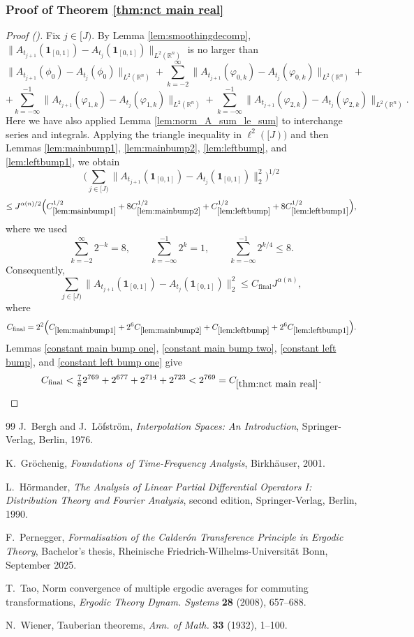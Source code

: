 \documentclass[12pt,reqno]{amsart}
\newcommand{\auto}{{({\tiny\faCar})}}
\theoremstyle{plain}
\numberwithin{equation}{section}
\theoremstyle{remark}
\newcommand{\R}{{\mathbb R}}
\begin{document}
\subsubsection{\texorpdfstring{Proof of Theorem \ref{thm:nct main real}}{Proof of main theorem}}
\begin{proof}[Proof \auto]
Fix $j\in [J)$.
By Lemma \ref{lem:smoothingdecomp},
$\|A_{t_{j + 1}}(\mathbf{1}_{[0,1]}) - A_{t_{j}}(\mathbf{1}_{[0,1]})\|_{{L}^2(\R^n)}$
is no larger than
\[ \|A_{t_{j+1}}(\phi_0) - A_{t_j}(\phi_0)\|_{L^2(\R^n)}  + \sum_{k=-2}^\infty\|A_{t_{j+1}}(\varphi_{0,k}) - A_{t_{j}}(\varphi_{0,k})\|_{L^2(\R^n)}  + \]
\[ +\sum_{k=-\infty}^{-1}\|A_{t_{j+1}}(\varphi_{1,k}) - A_{t_{j}}(\varphi_{1,k})\|_{L^2(\R^n)}  + \sum_{k=-\infty}^{-1}\|A_{t_{j+1}}({\varphi_{2,k}}) - A_{t_{j}}({\varphi_{2,k}})\|_{L^2(\R^n)}. \]
Here we have also applied Lemma \ref{lem:norm_A_sum_le_sum} to interchange series and integrals.
Applying the triangle inequality in $\ell^2([J))$ and then Lemmas \ref{lem:mainbump1}, \ref{lem:mainbump2}, \ref{lem:leftbump}, and \ref{lem:leftbump1}, we obtain
\[
\Big(\sum_{j\in[J)}\|A_{t_{j+1}}(\mathbf1_{[0,1]})-A_{t_j}(\mathbf1_{[0,1]})\|_2^2\Big)^{1/2}
\]
\[
\le J^{\alpha(n)/2}\Big(
C_{\ref{lem:mainbump1}}^{1/2}
+8C_{\ref{lem:mainbump2}}^{1/2}
+C_{\ref{lem:leftbump}}^{1/2}
+8C_{\ref{lem:leftbump1}}^{1/2}
\Big),
\]
where we used
\[
\sum_{k=-2}^\infty2^{-k}=8,
\qquad
\sum_{k=-\infty}^{-1}2^k=1,
\qquad
\sum_{k=-\infty}^{-1}2^{k/4}\le8.
\]
Consequently,
\[
\sum_{j\in[J)}\|A_{t_{j+1}}(\mathbf1_{[0,1]})-A_{t_j}(\mathbf1_{[0,1]})\|_2^2
\le C_{\mathrm{final}}J^{\alpha(n)},
\]
where
\[
C_{\mathrm{final}}
=2^2\Big(
C_{\ref{lem:mainbump1}}
+2^6C_{\ref{lem:mainbump2}}
+C_{\ref{lem:leftbump}}
+2^6C_{\ref{lem:leftbump1}}
\Big).
\]
Lemmas \ref{constant main bump one}, \ref{constant main bump two}, \ref{constant left bump}, and \ref{constant left bump one} give
\[
C_{\mathrm{final}}
<\tfrac78 2^{769}+2^{677}+2^{714}+2^{723}
<2^{769}=C_{\ref{thm:nct main real}}.
\]
\end{proof}

\begin{thebibliography}{99}
J.~Bergh and J.~L\"ofstr\"om,
\emph{Interpolation Spaces: An Introduction},
Springer-Verlag, Berlin, 1976.

K.~Gr\"ochenig,
\emph{Foundations of Time-Frequency Analysis},
Birkh\"auser, 2001.

L.~H\"ormander,
\emph{The Analysis of Linear Partial Differential Operators I: Distribution Theory and Fourier Analysis},
second edition, Springer-Verlag, Berlin, 1990.

F.~Pernegger,
\emph{Formalisation of the Calder\'on Transference Principle in Ergodic Theory},
Bachelor's thesis, Rheinische Friedrich-Wilhelms-Universit\"at Bonn, September 2025.

T.~Tao,
Norm convergence of multiple ergodic averages for commuting transformations,
\emph{Ergodic Theory Dynam. Systems} \textbf{28} (2008), 657--688.

N.~Wiener,
Tauberian theorems,
\emph{Ann. of Math.} \textbf{33} (1932), 1--100.
\end{thebibliography}
\end{document}
